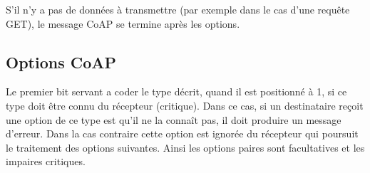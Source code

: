 S’il n’y a pas de données à transmettre (par exemple dans le cas d’une requête GET), le message CoAP se termine après les options.

\subsection{Options CoAP}

Le premier bit servant a coder le type décrit, quand il est positionné à 1, si ce type doit être connu du récepteur (critique). Dans ce cas, si un destinataire reçoit une option de ce type est qu'il ne la connaît pas, il doit produire un message d'erreur. Dans la cas contraire cette option est ignorée du récepteur qui poursuit le traitement des options suivantes. Ainsi les options paires sont facultatives et les impaires critiques.   

